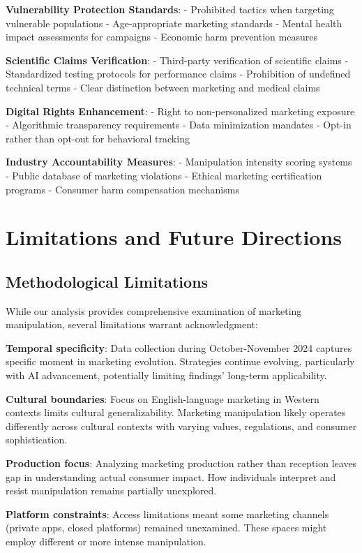 \textbf{Vulnerability Protection Standards}:
- Prohibited tactics when targeting vulnerable populations
- Age-appropriate marketing standards
- Mental health impact assessments for campaigns
- Economic harm prevention measures

\textbf{Scientific Claims Verification}:
- Third-party verification of scientific claims
- Standardized testing protocols for performance claims
- Prohibition of undefined technical terms
- Clear distinction between marketing and medical claims

\textbf{Digital Rights Enhancement}:
- Right to non-personalized marketing exposure
- Algorithmic transparency requirements
- Data minimization mandates
- Opt-in rather than opt-out for behavioral tracking

\textbf{Industry Accountability Measures}:
- Manipulation intensity scoring systems
- Public database of marketing violations
- Ethical marketing certification programs
- Consumer harm compensation mechanisms

\section{Limitations and Future Directions}
\label{sec:limitations_future}

\subsection{Methodological Limitations}

While our analysis provides comprehensive examination of marketing manipulation, several limitations warrant acknowledgment:

\textbf{Temporal specificity}: Data collection during October-November 2024 captures specific moment in marketing evolution. Strategies continue evolving, particularly with AI advancement, potentially limiting findings' long-term applicability.

\textbf{Cultural boundaries}: Focus on English-language marketing in Western contexts limits cultural generalizability. Marketing manipulation likely operates differently across cultural contexts with varying values, regulations, and consumer sophistication.

\textbf{Production focus}: Analyzing marketing production rather than reception leaves gap in understanding actual consumer impact. How individuals interpret and resist manipulation remains partially unexplored.

\textbf{Platform constraints}: Access limitations meant some marketing channels (private apps, closed platforms) remained unexamined. These spaces might employ different or more intense manipulation.


